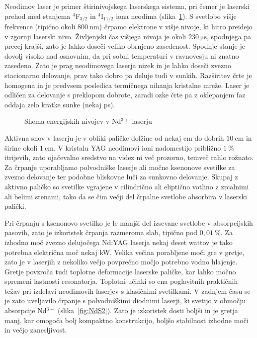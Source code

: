Neodimov laser je primer štirinivojskega laserskega sistema, pri čemer je 
laserski prehod med stanjema $^4$F$_{3/2}$ in $^4$I$_{11/2}$ iona neodima 
(slika~\ref{fig:NdE}). S svetlobo višje frekvence 
(tipično okoli $800~\si{\nano\metre}$) črpamo elektrone v višje nivoje, ki hitro 
preidejo v zgornji laserski nivo. Življenjski čas višjega nivoja je 
okoli $230~\si{\micro\second}$, spodnjega pa precej krajši, zato je 
lahko doseči veliko obrnjeno zasedenost. Spodnje stanje je dovolj visoko nad 
osnovnim, da pri sobni temperaturi v ravnovesju ni znatno zasedeno. Zato je 
prag neodimovega laserja nizek in je lahko doseči zvezno stacionarno delovanje, 
prav tako dobro pa deluje tudi v sunkih. Razširitev črte je homogena in je predvsem posledica
termičnega nihanja kristalne mreže. Laser je odličen za delovanje s preklopom dobrote, 
zaradi ozke črte pa z oklepanjem faz oddaja zelo kratke sunke (nekaj ps). 

\begin{figure}[h]
\centering
\def\svgwidth{80truemm} 

\caption{Shema energijskih nivojev v Nd$^{3+}$ laserju}
\label{fig:NdE}
\end{figure}

Aktivna snov v laserju je v obliki paličke dolžine od nekaj cm do dobrih $10~\si{\centi\metre}$
in širine okoli $1~\si{\centi\metre}$. 
V kristalu YAG neodimovi ioni nadomestijo približno $1~\%$ itrijevih, zato ojačevalno
sredstvo na videz ni več prozorno, temveč rahlo rožnato. 
Za črpanje uporabljamo polvodniške laserje ali močne ksenonove svetilke za zvezno delovanje 
ter podobne bliskovne luči za sunkovno delovanje. Skupaj z aktivno paličko so svetilke vgrajene
v cilindrično ali eliptično votlino z zrcalnimi ali belimi stenami, tako da se
čim večji del črpalne svetlobe absorbira v laserski palički.

Pri črpanju s ksenonovo svetilko je le manjši del izsevane svetlobe v
absorpcijskih pasovih, zato je izkoristek črpanja razmeroma slab, tipično 
pod $0,01~\%$. Za izhodno moč zvezno delujočega Nd:YAG laserja nekaj deset wattov je tako
potrebna električna moč nekaj kW. Velika večina porabljene moči 
gre v gretje, zato je v laserjih z nekoliko večjo povprečno
močjo potrebno vodno hlajenje. Gretje povzroča tudi toplotne deformacije
laserske paličke, kar lahko močno spremeni lastnosti resonatorja. Toplotni
učinki so ena poglavitnih praktičnih težav pri izdelavi neodimovih
laserjev s klasičnimi svetilkami. V zadnjem času se je zato 
uveljavilo črpanje s polvodniškimi diodnimi laserji, ki svetijo v območju 
absorpcije Nd$^{3+}$ (slika~\ref{fig:NdS2}). Zato je izkoristek dosti 
boljši in je gretja manj, kar omogoča bolj kompaktno konstrukcijo, boljšo 
stabilnost izhodne moči in večjo zanesljivost.

